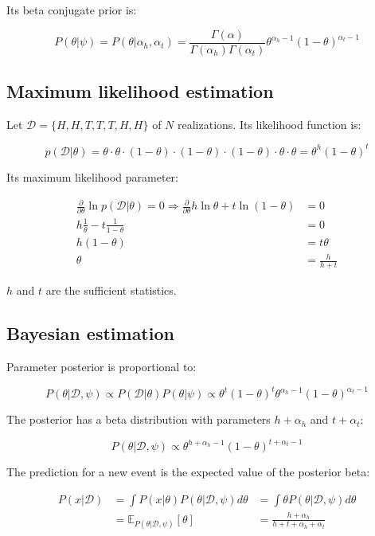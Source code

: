 	Its beta conjugate prior is:

	$$P(\theta|\psi) = P(\theta|\alpha_h, \alpha_t) = \frac{\Gamma(\alpha)}{\Gamma(\alpha_h)\Gamma(\alpha_t)}\theta^{\alpha_h-1}(1-\theta)^{\alpha_t-1}$$

	\subsection{Maximum likelihood estimation}
	Let $\mathcal{D} = \{H, H, T, T, T, H, H\}$ of $N$ realizations.
	Its likelihood function is:

	$$p(\mathcal{D}|\theta) = \theta\cdot\theta\cdot(1-\theta)\cdot(1-\theta)\cdot(1-\theta)\cdot\theta\cdot\theta = \theta^h(1-\theta)^t$$

	Its maximum likelihood parameter:

	\begin{align*}
		\frac{\partial}{\partial\theta}\ln p(\mathcal{D}|\theta) = 0\Rightarrow \frac{\partial}{\partial\theta}h\ln\theta + t\ln(1-\theta) &=0\\
		h\frac{1}{\theta}-t\frac{1}{1-\theta}&=0\\
		h(1-\theta) &= t\theta\\
		\theta &= \frac{h}{h+t}
	\end{align*}

	$h$ and $t$ are the sufficient statistics.

	\subsection{Bayesian estimation}
	Parameter posterior is proportional to:

	$$P(\theta|\mathcal{D}, \psi)\propto P(\mathcal{D}|\theta)P(\theta|\psi)\propto \theta^t(1-\theta)^t\theta^{\alpha_h-1}(1-\theta)^{\alpha_t-1}$$

	The posterior has a beta distribution with parameters $h+\alpha_h$ and $t+\alpha_t$:

	$$P(\theta|\mathcal{D}, \psi)\propto\theta^{h+\alpha_h-1}(1-\theta)^{t+\alpha_t-1}$$

	The prediction for a new event is the expected value of the posterior beta:

	\begin{align*}
		P(x|\mathcal{D}) &=\int P(x|\theta)P(\theta|\mathcal{D}, \psi)d\theta & = \int \theta P(\theta|\mathcal{D}, \psi)d\theta\\
										 &=\mathbb{E}_{P(\theta|\mathcal{D}, \psi)}[\theta] &= \frac{h+\alpha_h}{h+t+\alpha_h+\alpha_t}
	\end{align*}

